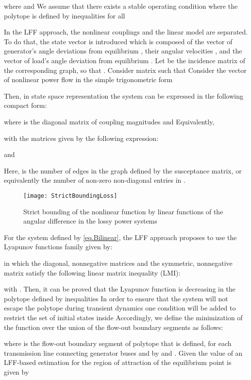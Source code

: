 \documentclass[final]{IEEEtran}
\begin{document}
where  and  We assume that there exists a stable operating
condition  where the
polytope  is defined by inequalities
 for all 

In the LFF approach, the nonlinear couplings and the linear model
are separated. To do that, the state vector 
is introduced which is composed of the vector of generator's angle
deviations from equilibrium , their angular velocities , and the vector of load's
angle deviation from equilibrium
.
Let  be the incidence matrix of the corresponding graph, so
that . Consider matrix
 such that   Consider the
vector of nonlinear power flow  in the simple trigonometric
form 

Then, in state space representation the system can be expressed in
the following compact form:

where  is
the diagonal matrix of  coupling magnitudes and 
Equivalently,

with the matrices  given by the following expression:

and

Here,  is the number of edges in the graph defined
by the susceptance matrix, or equivalently the number of non-zero
non-diagonal entries in .

\begin{figure}
\centering
\texttt{[image: StrictBoundingLoss]}
\caption{Strict bounding of the nonlinear function  by
linear functions of the angular difference
 in the lossy power systems}
\label{fig.StrictBoundingLoss}
\end{figure}

For the system defined by \eqref{eq.Bilinear}, the LFF approach
proposes to use the Lyapunov functions family  given by:

in which  the diagonal, nonnegative matrices   and the
symmetric, nonnegative matrix  satisfy the following linear
matrix inequality (LMI):

with . Then, it can be proved that the
Lyapunov function is decreasing in the polytope 
defined by inequalities  In order to ensure that the
system will not escape the polytope  during transient
dynamics one condition will be added to restrict the set of
initial states inside  Accordingly, we define the
minimization of the function  over the union
 of the flow-out boundary segments
 as follows:

where  is the flow-out boundary
segment of polytope  that is defined, for each
transmission line  connecting generator
buses  and  by  and
. Given the value of
 an LFF-based estimation for the region of attraction
of the equilibrium point is given by
\end{document}
